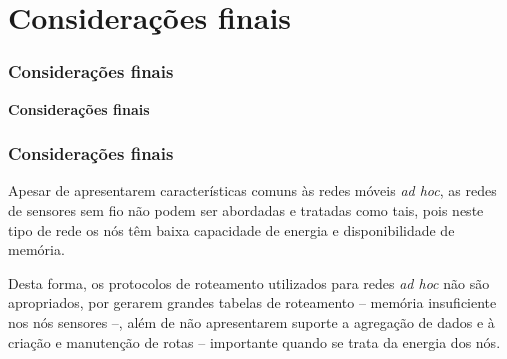 \documentclass[notes]{beamer}
\begin{document}
\section{Considerações finais}
\begin{frame}
\frametitle{Considerações finais}

\begin{block}

 \center \textbf{Considerações finais}

\end{block}

\end{frame}

\begin{frame}
\frametitle{Considerações finais}

\begin{block}

Apesar de apresentarem características comuns às redes móveis \textit{ad hoc}, as redes de sensores sem fio não podem ser abordadas e tratadas como tais, pois neste tipo de rede os nós têm baixa capacidade de energia e disponibilidade de memória.
\end{block} \pause

\begin{block}
Desta forma, os protocolos de roteamento utilizados para redes \textit{ad hoc} não são apropriados, por gerarem grandes tabelas de roteamento – memória insuficiente nos nós sensores –, além de não apresentarem suporte a agregação de dados e à criação e manutenção de rotas – importante quando se trata da energia dos nós.  

\end{block} 

\end{frame}
\end{document}
